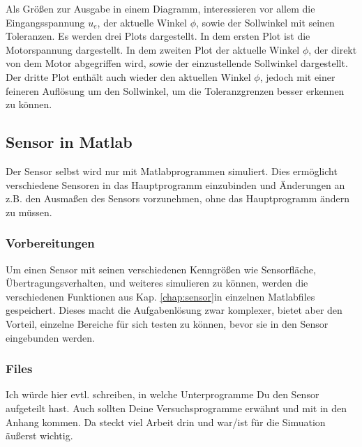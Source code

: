 Als Größen zur Ausgabe in einem Diagramm, interessieren vor allem die Eingangsspannung $u_e$, der aktuelle Winkel $\phi$, sowie der Sollwinkel mit seinen Toleranzen.
Es werden drei Plots dargestellt.
In dem ersten Plot ist die Motorspannung dargestellt.
In dem zweiten Plot der aktuelle Winkel $\phi$, der direkt von dem Motor abgegriffen wird, sowie der einzustellende Sollwinkel dargestellt.
Der dritte Plot enthält auch wieder den aktuellen Winkel $\phi$, jedoch mit einer feineren Auflösung um den Sollwinkel, um die Toleranzgrenzen besser erkennen zu können.

\subsection{Sensor in Matlab}
Der Sensor selbst wird nur mit Matlabprogrammen simuliert.
Dies ermöglicht verschiedene Sensoren in das Hauptprogramm einzubinden und Änderungen an z.B. den Ausmaßen des Sensors vorzunehmen, ohne das Hauptprogramm ändern zu müssen.

\subsubsection{Vorbereitungen}
Um einen Sensor mit seinen verschiedenen Kenngrößen wie Sensorfläche, Übertragungsverhalten, und weiteres simulieren zu können, werden die verschiedenen Funktionen aus
Kap. \ref{chap:sensor}in einzelnen Matlabfiles gespeichert. 
Dieses macht die Aufgabenlösung zwar komplexer, bietet aber den Vorteil, einzelne Bereiche für sich testen zu können, bevor sie in den Sensor eingebunden werden.

\subsubsection{Files}
Ich würde hier evtl. schreiben, in welche Unterprogramme Du den Sensor aufgeteilt hast.
Auch sollten Deine Versuchsprogramme erwähnt und mit in den Anhang kommen.
Da steckt viel Arbeit drin und war/ist für die Simuation äußerst wichtig.
